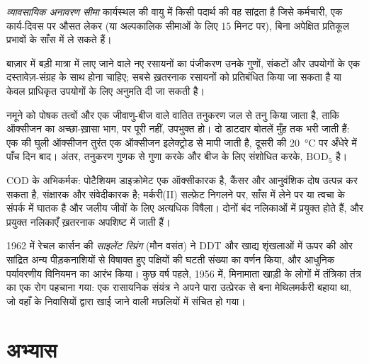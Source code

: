 \begin{definition}[व्यावसायिक अनावरण सीमा]\label{def:b3:environmental-toxicology:oel}
\emph{व्यावसायिक अनावरण सीमा} कार्यस्थल की वायु में
किसी पदार्थ की वह सांद्रता है जिसे कर्मचारी, एक कार्य-दिवस पर औसत लेकर
(या अल्पकालिक सीमाओं के लिए 15 मिनट पर), बिना अपेक्षित प्रतिकूल प्रभावों के
साँस में ले सकते हैं।
\end{definition}

बाज़ार में बड़ी मात्रा में लाए जाने वाले नए रसायनों का पंजीकरण उनके
गुणों, संकटों और उपयोगों के एक दस्तावेज़-संग्रह के साथ होना चाहिए; सबसे ख़तरनाक रसायनों को
प्रतिबंधित किया जा सकता है या केवल प्राधिकृत उपयोगों के लिए अनुमति दी जा सकती है।

\begin{inthelab}
नमूने को पोषक तत्वों और एक जीवाणु-बीज वाले वातित तनुकरण जल से
तनु किया जाता है, ताकि ऑक्सीजन का अच्छा-ख़ासा भाग, पर पूरी नहीं, उपभुक्त हो। दो
डाटदार बोतलें मुँह तक भरी जाती हैं: एक की घुली ऑक्सीजन तुरंत
एक ऑक्सीजन इलेक्ट्रोड से मापी जाती है, दूसरी की
\qty{20}{\celsius} पर अँधेरे में पाँच दिन बाद। अंतर, तनुकरण गुणक से गुणा करके और बीज के लिए संशोधित करके,
$\mathrm{BOD_5}$ है।
\end{inthelab}

\begin{safety}{}
COD के अभिकर्मक: पोटैशियम डाइक्रोमेट एक ऑक्सीकारक है, कैंसर और
आनुवंशिक दोष उत्पन्न कर सकता है, संक्षारक और संवेदीकारक है; मर्करी(II) सल्फ़ेट निगलने पर,
साँस में लेने पर या त्वचा के संपर्क में घातक है और जलीय जीवों के लिए अत्यधिक विषैला। दोनों
बंद नलिकाओं में प्रयुक्त होते हैं, और प्रयुक्त नलिकाएँ ख़तरनाक अपशिष्ट में जाती हैं।
\end{safety}

\begin{history}[एक पुस्तक और एक खाड़ी]
1962 में रेचल कार्सन की \textit{साइलेंट स्प्रिंग} (मौन वसंत) ने DDT और खाद्य शृंखलाओं में ऊपर की ओर सांद्रित
अन्य पीड़कनाशियों से विषाक्त हुए पक्षियों की घटती संख्या का वर्णन किया, और आधुनिक
पर्यावरणीय विनियमन का आरंभ किया। कुछ वर्ष पहले, 1956 में, मिनामाता खाड़ी के लोगों में
तंत्रिका तंत्र का एक रोग पहचाना गया: एक रासायनिक संयंत्र ने
अपने पारा उत्प्रेरक से बना मेथिलमर्करी बहाया था, जो
वहाँ के निवासियों द्वारा खाई जाने वाली मछलियों में संचित हो गया।
\end{history}

\section{अभ्यास}

